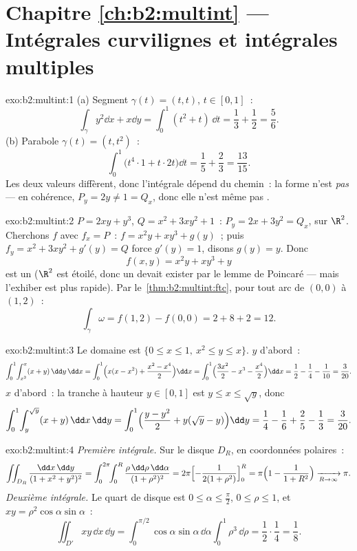 \section*{Chapitre \ref{ch:b2:multint} --- Intégrales curvilignes et intégrales multiples}

\begin{solution}{exo:b2:multint:1}
(a) Segment $\gamma(t) = (t, t)$, $t \in [0,1]$~:
\[
\int_\gamma y^2\dd x + x\dd y
= \int_0^1 (t^2 + t)\,\dd t = \frac13 + \frac12 = \frac56 .
\]
(b) Parabole $\gamma(t) = (t, t^2)$~:
\[
\int_0^1 \bigl(t^4\cdot 1 + t\cdot 2t\bigr)\dd t
= \frac15 + \frac23 = \frac{13}{15} .
\]
Les deux valeurs diffèrent, donc l'intégrale dépend du chemin~: la forme
n'est \emph{pas}  --- en cohérence, $P_y = 2y \neq 1 = Q_x$, donc
elle n'est même pas .
\end{solution}

\begin{solution}{exo:b2:multint:2}
$P = 2xy + y^3$, $Q = x^2 + 3xy^2 + 1$~: $P_y = 2x + 3y^2 = Q_x$,
 sur $\R^2$. Cherchons $f$ avec $f_x = P$~: $f = x^2y + xy^3
+ g(y)$~; puis $f_y = x^2 + 3xy^2 + g'(y) = Q$ force $g'(y) = 1$,
disons $g(y) = y$. Donc
\[
f(x, y) = x^2y + xy^3 + y
\]
est un  ($\R^2$ est étoilé, donc un  devait
exister par le lemme de Poincaré --- mais l'exhiber est plus rapide). Par
le~\cref{thm:b2:multint:ftc}, pour tout arc de $(0,0)$ à $(1,2)$~:
\[
\int_\gamma\omega = f(1, 2) - f(0, 0) = 2 + 8 + 2 = 12 .
\]
\end{solution}

\begin{solution}{exo:b2:multint:3}
Le domaine est $\{0 \leq x \leq 1,\ x^2 \leq y \leq x\}$.
$y$ d'abord~:
\[
\int_0^1\!\int_{x^2}^{x}(x + y)\,\dd y\,\dd x
= \int_0^1\Bigl(x(x - x^2)
+ \frac{x^2 - x^4}{2}\Bigr)\dd x
= \int_0^1\Bigl(\frac{3x^2}{2} - x^3 - \frac{x^4}{2}\Bigr)\dd x
= \frac12 - \frac14 - \frac1{10} = \frac{3}{20} .
\]
$x$ d'abord~: la tranche à hauteur $y \in [0, 1]$ est $y \leq x \leq
\sqrt y$, donc
\[
\int_0^1\!\int_{y}^{\sqrt y}(x + y)\,\dd x\,\dd y
= \int_0^1\Bigl(\frac{y - y^2}{2}
+ y(\sqrt y - y)\Bigr)\dd y
= \frac14 - \frac16 + \frac25 - \frac13 = \frac{3}{20} .
\]
\end{solution}

\begin{solution}{exo:b2:multint:4}
\emph{Première intégrale.} Sur le disque $D_R$, en coordonnées polaires~:
\[
\iint_{D_R}\frac{\dd x\,\dd y}{(1 + x^2 + y^2)^2}
= \int_0^{2\pi}\!\!\int_0^R
\frac{\rho\,\dd\rho\,\dd\alpha}{(1 + \rho^2)^2}
= 2\pi\Bigl[-\frac{1}{2(1 + \rho^2)}\Bigr]_0^R
= \pi\Bigl(1 - \frac{1}{1 + R^2}\Bigr)
\xrightarrow[R \to \infty]{} \pi .
\]
\emph{Deuxième intégrale.} Le quart de disque est $0 \leq \alpha \leq
\frac\pi2$, $0 \leq \rho \leq 1$, et $xy =
\rho^2\cos\alpha\sin\alpha$~:
\[
\iint_{D'}xy\,\dd x\,\dd y
= \int_0^{\pi/2}\!\!\cos\alpha\sin\alpha\,\dd\alpha
\int_0^1 \rho^3\,\dd\rho
= \frac12\cdot\frac14 = \frac18 .
\]
\end{solution}

